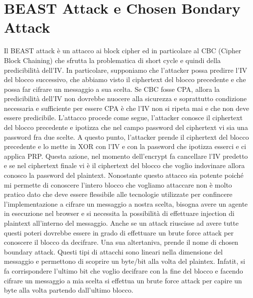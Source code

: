 \documentclass{article}
\begin{document}
\section{BEAST Attack e Chosen Bondary Attack}
Il BEAST attack è un attacco ai block cipher ed in particolare al CBC (Cipher Block Chaining) che sfrutta la problematica di short cycle e quindi della predicibilità dell'IV\@. In particolare, supponiamo che l'attacker possa predirre l'IV del blocco successivo, che abbiamo visto il ciphertext del blocco precedente e che possa far cifrare un messaggio a sua scelta\@.\newline
Se CBC fosse CPA, allora la predicibilità dell'IV non dovrebbe nuocere alla sicurezza e soprattutto condizione necessaria e sufficiente per essere CPA è che l'IV non si ripeta mai e che non deve essere predicibile\@.\newline
L'attacco procede come segue, l'attacker conosce il ciphertext del blocco precedente e ipotizza che nel campo password del ciphertext vi sia una password fra due scelte\@. A questo punto, l'attacker prende il ciphertext del blocco precedente e lo mette in XOR con l'IV e con la password che ipotizza esserci e ci applica PRP\@. Questa azione, nel momento dell'encrypt fa cancellare l'IV predetto e se nel ciphertext finale vi è il ciphertext del blocco che voglio indovinare allora conosco la password del plaintext\@. \newline
Nonostante questo attacco sia potente poiché mi permette di conoscere l'intero blocco che vogliamo attaccare non è molto pratico dato che deve essere flessibile alle tecnologie utilizzate per confincere l'implementazione a cifrare un messaggio a nostra scelta, bisogna avere un agente in esecuzione nel browser e si necessita la possibilità di effettuare injection di plaintext all'interno del messaggio\@. Anche se un attack riuscisse ad avere tutte questi poteri dovrebbe essere in grado di effettuare un brute force attack per conoscere il blocco da decifrare\@.\newline
Una sua altertaniva, prende il nome di chosen boundary attack\@. Questi tipi di attacchi sono lineari nella dimensione del messaggio e permettono di scoprire un byte/bit alla volta del plaintex\@. Infatit, si fa corrispondere l'ultimo bit che voglio decifrare con la fine del blocco e facendo cifrare un messaggio a mia scelta si effettua un brute force attack per capire un byte alla volta partendo dall'ultimo blocco\@.
\end{document}
